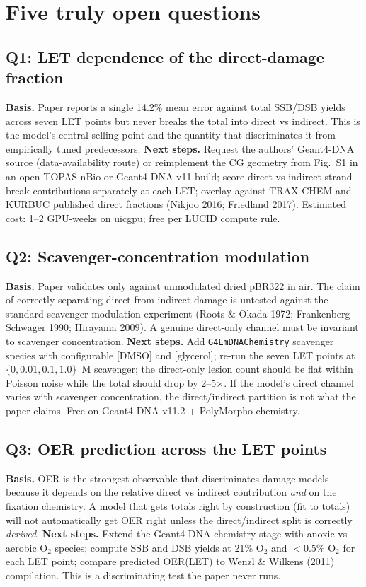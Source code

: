 \section{Five truly open questions}

\subsection*{Q1: LET dependence of the direct-damage fraction}
\textbf{Basis.} Paper reports a single 14.2\% mean error against total
SSB/DSB yields across seven LET points but never breaks the total into
direct vs indirect. This is the model's central selling point and the
quantity that discriminates it from empirically tuned predecessors.
\textbf{Next steps.} Request the authors' Geant4-DNA source (data-availability
route) or reimplement the CG geometry from Fig.~S1 in an open TOPAS-nBio
or Geant4-DNA v11 build; score direct vs indirect strand-break
contributions separately at each LET; overlay against TRAX-CHEM and
KURBUC published direct fractions (Nikjoo 2016; Friedland 2017).
Estimated cost: 1--2 GPU-weeks on uicgpu; free per LUCID compute rule.

\subsection*{Q2: Scavenger-concentration modulation}
\textbf{Basis.} Paper validates only against unmodulated dried pBR322 in
air. The claim of correctly separating direct from indirect damage is
untested against the standard scavenger-modulation experiment
(Roots \& Okada 1972; Frankenberg-Schwager 1990; Hirayama 2009). A
genuine direct-only channel must be invariant to scavenger concentration.
\textbf{Next steps.} Add \texttt{G4EmDNAChemistry} scavenger species with
configurable [DMSO] and [glycerol]; re-run the seven LET points at
$\{0, 0.01, 0.1, 1.0\}$~M scavenger; the direct-only lesion count should
be flat within Poisson noise while the total should drop by 2--5$\times$.
If the model's direct channel varies with scavenger concentration, the
direct/indirect partition is not what the paper claims. Free on
Geant4-DNA v11.2 + PolyMorpho chemistry.

\subsection*{Q3: OER prediction across the LET points}
\textbf{Basis.} OER is the strongest observable that discriminates
damage models because it depends on the relative direct vs indirect
contribution \emph{and} on the fixation chemistry. A model that gets
totals right by construction (fit to totals) will not automatically get
OER right unless the direct/indirect split is correctly \emph{derived}.
\textbf{Next steps.} Extend the Geant4-DNA chemistry stage with
anoxic vs aerobic O$_2$ species; compute SSB and DSB yields at 21\%
O$_2$ and $<0.5\%$ O$_2$ for each LET point; compare predicted
OER(LET) to Wenzl \& Wilkens (2011) compilation. This is a
discriminating test the paper never runs.

